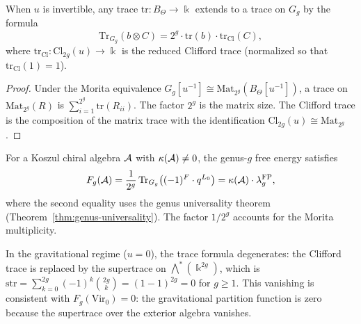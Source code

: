 \begin{proposition}
\label{prop:g9-trace-formula}
When $u$ is invertible, any trace $\mathrm{tr}\colon B_\Theta \to \Bbbk$
extends to a trace on $G_g$ by the formula
\begin{equation}\label{eq:g9-trace-formula}
\mathrm{Tr}_{G_g}(b \otimes C) =
2^g \cdot \mathrm{tr}(b) \cdot \mathrm{tr}_{\mathrm{Cl}}(C),
\end{equation}
where $\mathrm{tr}_{\mathrm{Cl}}\colon \mathrm{Cl}_{2g}(u)
\to \Bbbk$ is the reduced Clifford trace (normalized so that
$\mathrm{tr}_{\mathrm{Cl}}(1) = 1$).
\end{proposition}

\begin{proof}
Under the Morita equivalence
$G_g[u^{-1}] \cong \mathrm{Mat}_{2^g}(B_\Theta[u^{-1}])$, a trace on
$\mathrm{Mat}_{2^g}(R)$ is $\sum_{i=1}^{2^g}\mathrm{tr}(R_{ii})$.
The factor $2^g$ is the matrix size. The Clifford trace is the
composition of the matrix trace with the identification
$\mathrm{Cl}_{2g}(u) \cong \mathrm{Mat}_{2^g}$.
\end{proof}

\begin{corollary}
\label{cor:g9-partition-trace}
For a Koszul chiral algebra $\mathcal{A}$ with $\kappa(\mathcal{A}) \neq 0$, the
genus-$g$ free energy satisfies
\begin{equation}\label{eq:g9-Fg-trace}
F_g(\mathcal{A}) = \frac{1}{2^g}\,\mathrm{Tr}_{G_g}\bigl(
(-1)^F \cdot q^{L_0}\bigr)
= \kappa(\mathcal{A}) \cdot \lambda_g^{\mathrm{FP}},
\end{equation}
where the second equality uses the genus universality theorem
(Theorem~\ref{thm:genus-universality}). The factor $1/2^g$ accounts
for the Morita multiplicity.
\end{corollary}

\begin{remark}[The partition function at $u = 0$]
\label{rem:g9-partition-u0}
In the gravitational regime ($u = 0$), the trace formula degenerates:
the Clifford trace is replaced by the supertrace on
$\bigwedge^*(\Bbbk^{2g})$, which is
$\mathrm{str} = \sum_{k=0}^{2g}(-1)^k\binom{2g}{k} =
(1-1)^{2g} = 0$ for $g \geq 1$. This vanishing is consistent with
$F_g(\mathrm{Vir}_0) = 0$: the gravitational partition function is
zero because the supertrace over the exterior algebra vanishes.
\end{remark}

